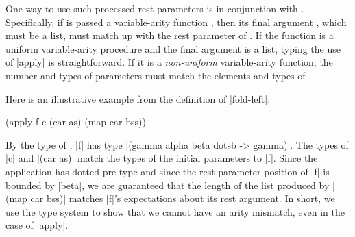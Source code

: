 \begin{schemeregion}
One way to use such processed rest parameters is in conjunction with
 . Specifically, if  is passed a variable-arity
 function , then its final argument , which must be a
 list, must match up with the rest parameter of .  If the
 function is a uniform variable-arity procedure and the final argument is a
 list, typing the use of \scheme|apply| is straightforward. If it is a
 {\em non-uniform} variable-arity function, the number and types of parameters
 must match the elements and types of .

Here is an illustrative example from the definition of \scheme|fold-left|:
\begin{schemedisplay}
(apply f c (car as) (map car bss))
\end{schemedisplay}
 By the type of
 , \scheme|f| has type \scheme|(gamma alpha beta dotsb ->
 gamma)|.  The types of \scheme|c| and \scheme|(car as)| match the types of
 the initial parameters to \scheme|f|.  Since the  application
 has dotted pre-type  and since the rest parameter
 position of \scheme|f| is bounded by \scheme|beta|, we are guaranteed that
 the length of the list produced by \scheme|(map car bss)| matches \scheme|f|'s
 expectations about its rest argument.  In short, we use
 the type system to show that we cannot have an arity mismatch,
 even in the case of \scheme|apply|.

\end{schemeregion}
